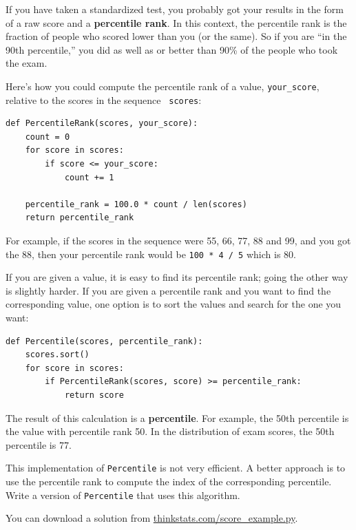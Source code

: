 \documentclass[12pt]{book}
\begin{document}
If you have taken a standardized test, you probably got your
results in the form of a raw score and a {\bf percentile rank}.
In this context, the percentile rank is the fraction of people who
scored lower than you (or the same).  So if you are ``in the 90th
percentile,'' you did as well as or better than 90\% of the people who
took the exam.

Here's how you could compute the percentile rank of a value,
\verb"your_score", relative to the scores in the sequence {\tt
  scores}:

\begin{verbatim}
def PercentileRank(scores, your_score):
    count = 0
    for score in scores:
        if score <= your_score:
            count += 1

    percentile_rank = 100.0 * count / len(scores)
    return percentile_rank
\end{verbatim}
%
%
For example, if the scores in the sequence were 55, 66, 77, 88 and 99,
and you got the 88, then your percentile rank would be {\tt 100 * 4 / 5}
which is 80.

If you are given a value, it is easy to find its percentile rank; going
the other way is slightly harder.  If you are given a percentile rank
and you want to find the corresponding value, one option is to
sort the values and search for the one you want:

\begin{verbatim}
def Percentile(scores, percentile_rank):
    scores.sort()
    for score in scores:
        if PercentileRank(scores, score) >= percentile_rank:
            return score
\end{verbatim}

The result of this calculation is a {\bf percentile}.  For example,
the 50th percentile is the value with percentile rank 50.  In the
distribution of exam scores, the 50th percentile is 77.


\begin{ex}
This implementation of {\tt Percentile} is not very efficient.  A
better approach is to use the percentile rank to compute the index of
the corresponding percentile.  Write a version of {\tt Percentile} that
uses this algorithm.

You can download a solution from \url{thinkstats.com/score_example.py}.


\end{ex}
\end{document}

